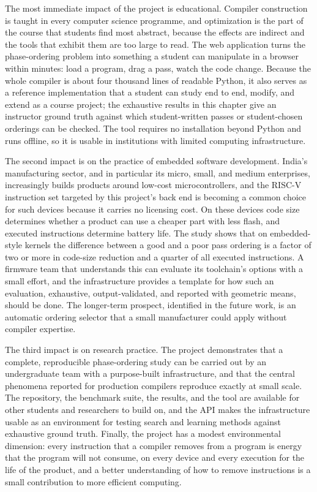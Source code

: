 The most immediate impact of the project is educational. Compiler construction is taught in every computer science programme, and optimization is the part of the course that students find most abstract, because the effects are indirect and the tools that exhibit them are too large to read. The web application turns the phase-ordering problem into something a student can manipulate in a browser within minutes: load a program, drag a pass, watch the code change. Because the whole compiler is about four thousand lines of readable Python, it also serves as a reference implementation that a student can study end to end, modify, and extend as a course project; the exhaustive results in this chapter give an instructor ground truth against which student-written passes or student-chosen orderings can be checked. The tool requires no installation beyond Python and runs offline, so it is usable in institutions with limited computing infrastructure.

The second impact is on the practice of embedded software development. India's manufacturing sector, and in particular its micro, small, and medium enterprises, increasingly builds products around low-cost microcontrollers, and the RISC-V instruction set targeted by this project's back end is becoming a common choice for such devices because it carries no licensing cost. On these devices code size determines whether a product can use a cheaper part with less flash, and executed instructions determine battery life. The study shows that on embedded-style kernels the difference between a good and a poor pass ordering is a factor of two or more in code-size reduction and a quarter of all executed instructions. A firmware team that understands this can evaluate its toolchain's options with a small effort, and the infrastructure provides a template for how such an evaluation, exhaustive, output-validated, and reported with geometric means, should be done. The longer-term prospect, identified in the future work, is an automatic ordering selector that a small manufacturer could apply without compiler expertise.

The third impact is on research practice. The project demonstrates that a complete, reproducible phase-ordering study can be carried out by an undergraduate team with a purpose-built infrastructure, and that the central phenomena reported for production compilers reproduce exactly at small scale. The repository, the benchmark suite, the results, and the tool are available for other students and researchers to build on, and the API makes the infrastructure usable as an environment for testing search and learning methods against exhaustive ground truth. Finally, the project has a modest environmental dimension: every instruction that a compiler removes from a program is energy that the program will not consume, on every device and every execution for the life of the product, and a better understanding of how to remove instructions is a small contribution to more efficient computing.

